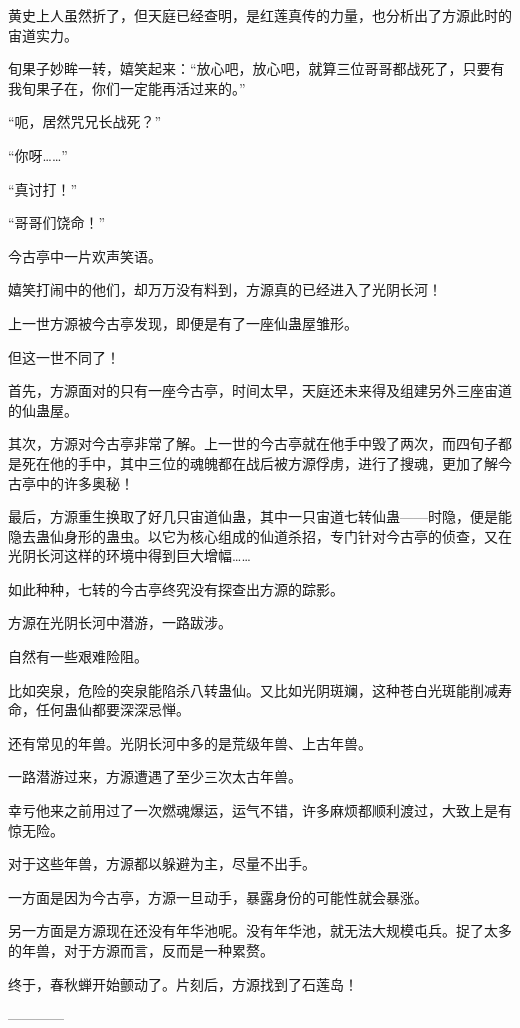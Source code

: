 \begin{this_body}
黄史上人虽然折了，但天庭已经查明，是红莲真传的力量，也分析出了方源此时的宙道实力。

旬果子妙眸一转，嬉笑起来：“放心吧，放心吧，就算三位哥哥都战死了，只要有我旬果子在，你们一定能再活过来的。”

“呃，居然咒兄长战死？”

“你呀……”

“真讨打！”

“哥哥们饶命！”

今古亭中一片欢声笑语。

嬉笑打闹中的他们，却万万没有料到，方源真的已经进入了光阴长河！

上一世方源被今古亭发现，即便是有了一座仙蛊屋雏形。

但这一世不同了！

首先，方源面对的只有一座今古亭，时间太早，天庭还未来得及组建另外三座宙道的仙蛊屋。

其次，方源对今古亭非常了解。上一世的今古亭就在他手中毁了两次，而四旬子都是死在他的手中，其中三位的魂魄都在战后被方源俘虏，进行了搜魂，更加了解今古亭中的许多奥秘！

最后，方源重生换取了好几只宙道仙蛊，其中一只宙道七转仙蛊——时隐，便是能隐去蛊仙身形的蛊虫。以它为核心组成的仙道杀招，专门针对今古亭的侦查，又在光阴长河这样的环境中得到巨大增幅……

如此种种，七转的今古亭终究没有探查出方源的踪影。

方源在光阴长河中潜游，一路跋涉。

自然有一些艰难险阻。

比如突泉，危险的突泉能陷杀八转蛊仙。又比如光阴斑斓，这种苍白光斑能削减寿命，任何蛊仙都要深深忌惮。

还有常见的年兽。光阴长河中多的是荒级年兽、上古年兽。

一路潜游过来，方源遭遇了至少三次太古年兽。

幸亏他来之前用过了一次燃魂爆运，运气不错，许多麻烦都顺利渡过，大致上是有惊无险。

对于这些年兽，方源都以躲避为主，尽量不出手。

一方面是因为今古亭，方源一旦动手，暴露身份的可能性就会暴涨。

另一方面是方源现在还没有年华池呢。没有年华池，就无法大规模屯兵。捉了太多的年兽，对于方源而言，反而是一种累赘。

终于，春秋蝉开始颤动了。片刻后，方源找到了石莲岛！

------------

\end{this_body}


